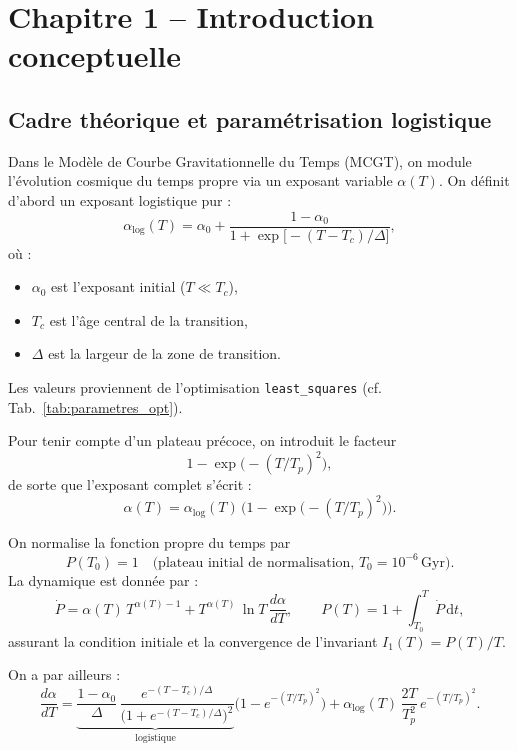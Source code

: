 \section{Chapitre 1 – Introduction conceptuelle}

\subsection{Cadre théorique et paramétrisation logistique}

Dans le Modèle de Courbe Gravitationnelle du Temps (MCGT), on module l’évolution cosmique du temps propre via un exposant variable \(\alpha(T)\). On définit d’abord un exposant logistique pur :
\[
  \alpha_{\mathrm{log}}(T)
  = \alpha_{0}
    + \frac{1 - \alpha_{0}}{1 + \exp\!\bigl[-(T - T_{c})/\Delta\bigr]},
\]
où :
\begin{itemize}
  \item \(\alpha_{0}\) est l’exposant initial (\(T\ll T_{c}\)),  
  \item \(T_{c}\) est l’âge central de la transition,  
  \item \(\Delta\) est la largeur de la zone de transition.
\end{itemize}

\begin{center}
\end{center}
Les valeurs proviennent de l’optimisation \texttt{least\_squares} (cf. Tab.~\ref{tab:parametres_opt}).

Pour tenir compte d’un plateau précoce, on introduit le facteur  
\[
  1 - \exp\!\bigl(-(T/T_{p})^{2}\bigr),
\]
de sorte que l’exposant complet s’écrit :
\[
  \alpha(T)
  = \alpha_{\mathrm{log}}(T)\,\bigl(1 - \exp\!\bigl(-(T/T_{p})^{2}\bigr)\bigr).
\]

On normalise la fonction propre du temps par  
\[
  P(T_{0}) = 1
  \quad\bigl(\text{plateau initial de normalisation, }T_{0}=10^{-6}\,\mathrm{Gyr}\bigr).
\]
La dynamique est donnée par :
\[
  \dot P
    = \alpha(T)\,T^{\alpha(T)-1}
    + T^{\alpha(T)}\,\ln T\,\frac{d\alpha}{dT},
\qquad
  P(T)
    = 1 + \int_{T_{0}}^{T}\dot P\,\mathrm{d}t,
\]
assurant la condition initiale et la convergence de l’invariant \(I_{1}(T)=P(T)/T\).

On a par ailleurs :
\[
  \frac{d\alpha}{dT}
  = \underbrace{\frac{1-\alpha_{0}}{\Delta}\,
    \frac{e^{-(T-T_{c})/\Delta}}{\bigl(1+e^{-(T-T_{c})/\Delta}\bigr)^{2}}
  }_{\text{logistique}}
  \bigl(1-e^{-(T/T_{p})^{2}}\bigr)
  + \alpha_{\mathrm{log}}(T)\,\frac{2T}{T_{p}^{2}}\,e^{-(T/T_{p})^{2}}.
\]


